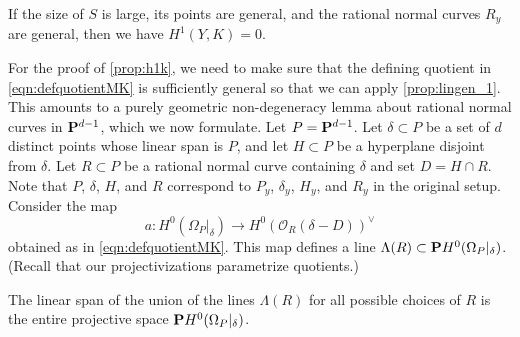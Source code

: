 \documentclass[11 pt]{amsart}
\renewcommand{\O}{{\mathcal O}}
\renewcommand {\P}{{\bf P}}
\providecommand {\from}{{\colon}}
\numberwithin{equation}{section}
\begin{document}
\begin{proposition}\label{prop:h1k}
  If the size of $S$ is large, its points are general, and the rational normal curves $R_y$ are general, then we have $H^1(Y, K) = 0$.
\end{proposition}
For the proof of \autoref{prop:h1k}, we need to make sure that the defining quotient in \eqref{eqn:defquotientMK} is sufficiently general so that we can apply \autoref{prop:lingen_1}.
This amounts to a purely geometric non-degeneracy lemma about rational normal curves in $\P^{d-1}$, which we now formulate.
Let $P = \P^{d-1}$.
Let $\delta \subset P$ be a set of $d$ distinct points whose linear span is $P$, and let $H \subset P$ be a hyperplane disjoint from $\delta$.
Let $R \subset P$ be a rational normal curve containing $\delta$ and set $D = H \cap R$.
Note that $P$, $\delta$, $H$, and $R$ correspond to $P_y$, $\delta_y$, $H_y$, and $R_y$ in the original setup.
Consider the map
\begin{equation}\label{eq:infmap}
  a \from H^0\left(\Omega_{P}\big|_\delta\right) \to H^0(\O_R(\delta-D))^\vee
\end{equation}
obtained as in \eqref{eqn:defquotientMK}.
This map defines a line $\Lambda(R) \subset \P H^0(\Omega_P | _\delta)$. (Recall that our projectivizations parametrize quotients.)
\begin{lemma}\label{lem:lingen}
  The linear span of the union of the lines $\Lambda(R)$ for all possible choices of $R$ is the entire projective space $\P H^0(\Omega_P |_\delta)$.
\end{lemma}
\end{document}
